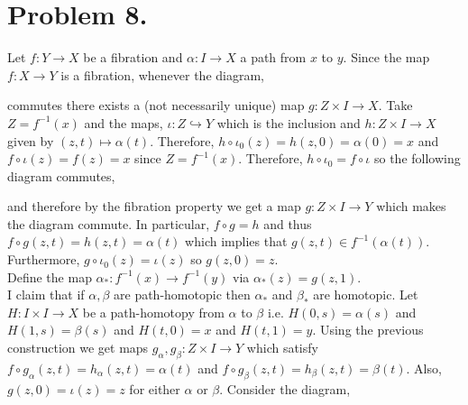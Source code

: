 \documentclass[12pt]{extarticle}
\begin{document}
\section*{Problem 8.}

Let $f : Y \to X$ be a fibration and $\alpha : I \to X$ a path from $x$ to $y$. Since the map $f : X \to Y$ is a fibration, whenever the diagram,
\begin{center}
\end{center}
commutes there exists a (not necessarily unique) map $g: Z \times I \to X$. Take $Z = f^{-1}(x)$ and the maps, $\iota : Z \hookrightarrow Y$ which is the inclusion and $h : Z \times I \to X$ given by $(z, t) \mapsto \alpha(t)$. Therefore, $h \circ \iota_0(z) = h(z, 0) = \alpha(0) = x$ and $f \circ \iota(z) = f(z) = x$ since $Z = f^{-1}(x)$. Therefore, $h \circ \iota_0 = f \circ \iota$ so the following diagram commutes, 
\begin{center}
\end{center}
and therefore by the fibration property we get a map $g : Z \times I \to Y$ which makes the diagram commute. In particular, $f \circ g = h$ and thus $f \circ g(z, t) = h(z, t) = \alpha(t)$ which implies that $g(z,t) \in f^{-1}(\alpha(t))$. Furthermore, $g \circ \iota_0(z) = \iota(z)$ so $g(z, 0) = z$. 
\bigskip\\
Define the map $\alpha_* : f^{-1}(x) \to f^{-1}(y)$ via $\alpha_*(z) = g(z, 1)$.   
\bigskip\\
I claim that if $\alpha, \beta$ are path-homotopic then $\alpha_*$ and $\beta_*$ are homotopic. Let $H : I \times I \to X$ be a path-homotopy from $\alpha$ to $\beta$ i.e. $H(0, s) = \alpha(s)$ and $H(1, s) = \beta(s)$ and $H(t, 0) = x$ and $H(t, 1) = y$. Using the previous construction we get maps $g_\alpha, g_\beta : Z \times I \to Y$ which satisfy $f \circ g_{\alpha}(z, t) = h_{\alpha}(z, t) = \alpha(t)$ and $f \circ g_{\beta}(z, t) = h_{\beta}(z, t) = \beta(t)$. Also, $g(z, 0) = \iota(z) = z$ for either $\alpha$ or $\beta$. Consider the diagram, 
\end{document}
